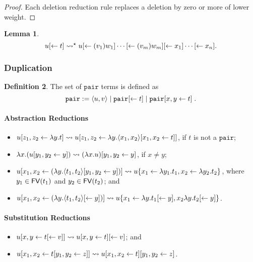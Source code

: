 \documentclass[11pt,a4paper]{article}
\theoremstyle{definition}
\newtheorem{definition}{Definition}
\theoremstyle{plain}
\newtheorem{lemma}[definition]{Lemma}
\theoremstyle{remark}
\begin{document}
\begin{proof}
Each deletion reduction rule replaces a deletion by zero or more of lower weight.
\end{proof}

\begin{lemma}
\[
u{[\leftarrow{t}]}\rightsquigarrow^\star u{[\leftarrow{(v_1)w_1}]}\cdots{[\leftarrow{(v_m)w_m}]}{[\leftarrow{x_1}]}\cdots{[\leftarrow{x_n}]}.
\]
\end{lemma}

\subsubsection{Duplication}

\newcommand{\tpair}{{\mathtt{pair}}}

\begin{definition}
	The set of $\tpair$ terms is defined as
	\[\tpair:=\terpair{u}{v}\;|\;\tpair\terdel{t}\;|\;\tpair\terdup{x}{y}{t}\;.\]
\end{definition}

\paragraph{Abstraction Reductions}

\begin{itemize}
	\item $u{[{z_1},{z_2}\leftarrow{\lambda y.t}]}\rightsquigarrow u{[{z_1},{z_2}\leftarrow{\lambda y.{\langle{x_1},{x_2}\rangle}{[{x_1},{x_2}\leftarrow{t}]}}]}$, if $t$ is not a $\tpair$;
	\item $\lambda x.(u{[{y_1},{y_2}\leftarrow{y}]})\rightsquigarrow (\lambda x.u){[{y_1},{y_2}\leftarrow{y}]}$, if $x\neq y$;
	\item $u{[{x_1},{x_2}\leftarrow{(\lambda y.{\langle{t_1},{t_2}\rangle}{[{y_1},{y_2}\leftarrow{y}]})}]}\rightsquigarrow u\{x_1\leftarrow\lambda y_1.t_1,x_2\leftarrow\lambda y_2.t_2\}$, where $y_1\in{\mathop{\mathsf{FV}}}(t_1)$ and $y_2\in{\mathop{\mathsf{FV}}}(t_2)$; and
	\item $u{[{x_1},{x_2}\leftarrow{(\lambda y.{\langle{t_1},{t_2}\rangle}{[\leftarrow{y}]})}]}\rightsquigarrow u\{x_1\leftarrow\lambda y.t_1{[\leftarrow{y}]},x_2\lambda y.t_2{[\leftarrow{y}]}\}$.
\end{itemize}

\paragraph{Substitution Reductions}

\begin{itemize}
	\item $u{[{x},{y}\leftarrow{t{[\leftarrow{v}]}}]}\rightsquigarrow u{[{x},{y}\leftarrow{t}]}{[\leftarrow{v}]}$; and
	\item $u{[{x_1},{x_2}\leftarrow{t{[{y_1},{y_2}\leftarrow{z}]}}]}\rightsquigarrow u{[{x_1},{x_2}\leftarrow{t}]}{[{y_1},{y_2}\leftarrow{z}]}$.
\end{itemize}
\end{document}
